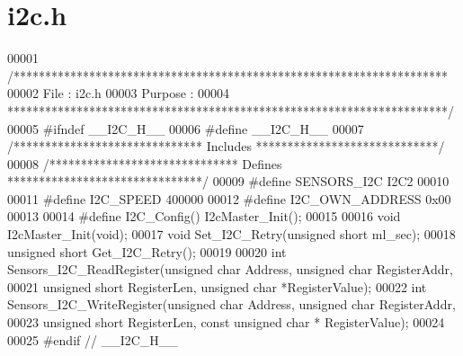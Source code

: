 \section{i2c.\+h}
\label{i2c_8h_source}

\begin{DoxyCode}
00001 \textcolor{comment}{/*********************************************************************}
00002 \textcolor{comment}{File    : i2c.h}
00003 \textcolor{comment}{Purpose : }
00004 \textcolor{comment}{**********************************************************************/}
00005 \textcolor{preprocessor}{#}\textcolor{preprocessor}{ifndef} \textcolor{preprocessor}{\_\_I2C\_H\_\_}
00006 \textcolor{preprocessor}{#}\textcolor{preprocessor}{define} \textcolor{preprocessor}{\_\_I2C\_H\_\_}
00007 \textcolor{comment}{/****************************** Includes *****************************/}
00008 \textcolor{comment}{/****************************** Defines *******************************/}
00009 \textcolor{preprocessor}{#}\textcolor{preprocessor}{define} \textcolor{preprocessor}{SENSORS\_I2C}               I2C2
00010 
00011 \textcolor{preprocessor}{#}\textcolor{preprocessor}{define} \textcolor{preprocessor}{I2C\_SPEED}                 400000
00012 \textcolor{preprocessor}{#}\textcolor{preprocessor}{define} \textcolor{preprocessor}{I2C\_OWN\_ADDRESS}           0x00
00013 
00014 \textcolor{preprocessor}{#}\textcolor{preprocessor}{define} \textcolor{preprocessor}{I2C\_Config}\textcolor{preprocessor}{(}\textcolor{preprocessor}{)} \textcolor{preprocessor}{I2cMaster\_Init}\textcolor{preprocessor}{(}\textcolor{preprocessor}{)}\textcolor{preprocessor}{;}
00015 
00016 \textcolor{keywordtype}{void} I2cMaster_Init(\textcolor{keywordtype}{void});
00017 \textcolor{keywordtype}{void} Set_I2C_Retry(\textcolor{keywordtype}{unsigned} \textcolor{keywordtype}{short} ml\_sec);
00018 \textcolor{keywordtype}{unsigned} \textcolor{keywordtype}{short} Get_I2C_Retry();
00019 
00020 \textcolor{keywordtype}{int} Sensors_I2C_ReadRegister(\textcolor{keywordtype}{unsigned} \textcolor{keywordtype}{char} Address, \textcolor{keywordtype}{unsigned} \textcolor{keywordtype}{char} RegisterAddr,
00021                                           \textcolor{keywordtype}{unsigned} \textcolor{keywordtype}{short} RegisterLen, \textcolor{keywordtype}{unsigned} \textcolor{keywordtype}{char} *RegisterValue);
00022 \textcolor{keywordtype}{int} Sensors_I2C_WriteRegister(\textcolor{keywordtype}{unsigned} \textcolor{keywordtype}{char} Address, \textcolor{keywordtype}{unsigned} \textcolor{keywordtype}{char} RegisterAddr,
00023                                            \textcolor{keywordtype}{unsigned} \textcolor{keywordtype}{short} RegisterLen, \textcolor{keyword}{const} \textcolor{keywordtype}{unsigned} \textcolor{keywordtype}{char} *
      RegisterValue);
00024 
00025 \textcolor{preprocessor}{#}\textcolor{preprocessor}{endif} \textcolor{comment}{// \_\_I2C\_H\_\_}
\end{DoxyCode}
